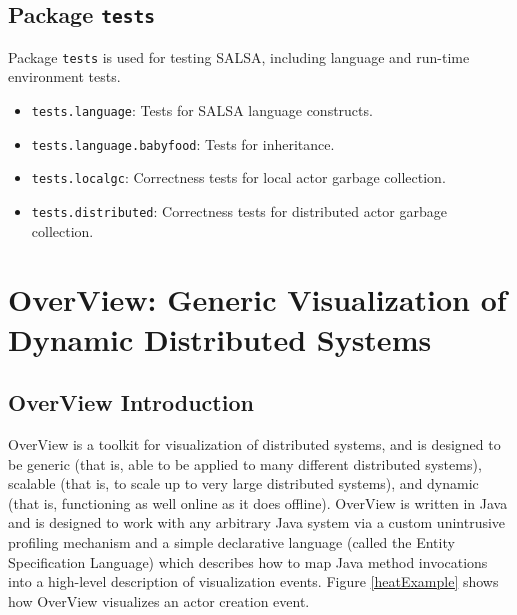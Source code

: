 {\section{Package {\tt tests}}
Package {\tt  tests} is used for testing SALSA, including language
and run-time environment tests.
\begin{itemize}
\item {\tt  tests.language}: Tests for SALSA language constructs.
\item {\tt  tests.language.babyfood}: Tests for inheritance.
\item {\tt  tests.localgc}: Correctness tests for local actor garbage collection.
\item {\tt  tests.distributed}: Correctness tests for distributed actor garbage collection.
\end{itemize}
}

\chapter{OverView: Generic Visualization of Dynamic Distributed Systems}\label{OverViewVisualization}
\section{OverView Introduction}
OverView is a toolkit for visualization of distributed systems, and is designed to be generic 
(that is, able to be applied to many different distributed systems), scalable 
(that is, to scale up to very large distributed systems), and dynamic 
(that is, functioning as well online as it does offline).
OverView is written in Java and is designed to work with any arbitrary Java system 
via a custom unintrusive profiling mechanism and a simple declarative language 
(called the Entity Specification Language) which describes how to map Java method invocations 
into a high-level description of visualization events. 
Figure \ref{heatExample} shows how OverView visualizes an actor creation event.

